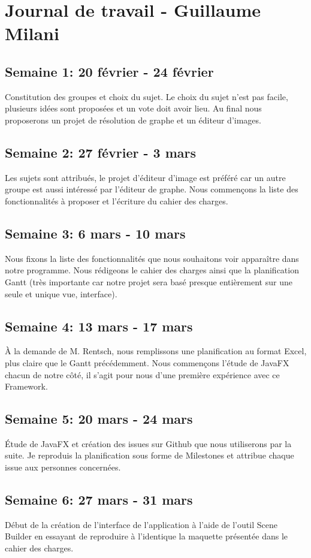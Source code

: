 \section{Journal de travail - Guillaume Milani}

\subsection{Semaine 1: 20 février - 24 février}
Constitution des groupes et choix du sujet. Le choix du sujet n'est pas facile, plusieurs idées sont proposées et un vote doit avoir lieu. Au final nous proposerons un projet de résolution de graphe et un éditeur d'images.
\subsection{Semaine 2: 27 février - 3 mars}
Les sujets sont attribués, le projet d'éditeur d'image est préféré car un autre groupe est aussi intéressé par l'éditeur de graphe. Nous commençons la liste des fonctionnalités à proposer et l'écriture du cahier des charges.
\subsection{Semaine 3: 6 mars - 10 mars}
Nous fixons la liste des fonctionnalités que nous souhaitons voir apparaître dans notre programme. Nous rédigeons le cahier des charges ainsi que la planification Gantt (très importante car notre projet sera basé presque entièrement sur une seule et unique vue, interface).
\subsection{Semaine 4: 13 mars - 17 mars}
À la demande de M. Rentsch, nous remplissons une planification au format Excel, plus claire que le Gantt précédemment. Nous commençons l'étude de JavaFX chacun de notre côté, il s'agit pour nous d'une première expérience avec ce Framework.
\subsection{Semaine 5: 20 mars - 24 mars}
Étude de JavaFX et création des issues sur Github que nous utiliserons par la suite. Je reproduis la planification sous forme de Milestones et attribue chaque issue aux personnes concernées.
\subsection{Semaine 6: 27 mars - 31 mars}
Début de la création de l'interface de l'application à l'aide de l'outil Scene Builder en essayant de reproduire à l'identique la maquette présentée dans le cahier des charges.
